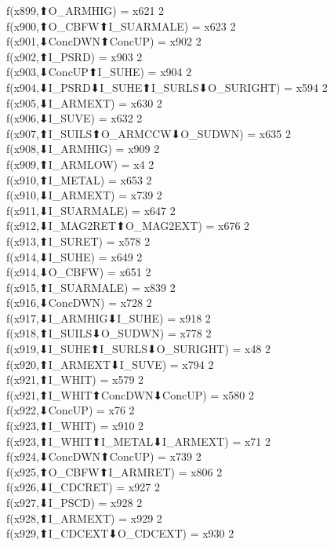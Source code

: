 f(x899,⬆O_ARMHIG) = x621 {2} \\
f(x900,⬆O_CBFW⬆I_SUARMALE) = x623 {2} \\
f(x901,⬇ConcDWN⬆ConcUP) = x902 {2} \\
f(x902,⬆I_PSRD) = x903 {2} \\
f(x903,⬇ConcUP⬆I_SUHE) = x904 {2} \\
f(x904,⬇I_PSRD⬇I_SUHE⬆I_SURLS⬇O_SURIGHT) = x594 {2} \\
f(x905,⬇I_ARMEXT) = x630 {2} \\
f(x906,⬇I_SUVE) = x632 {2} \\
f(x907,⬆I_SUILS⬆O_ARMCCW⬇O_SUDWN) = x635 {2} \\
f(x908,⬇I_ARMHIG) = x909 {2} \\
f(x909,⬆I_ARMLOW) = x4 {2} \\
f(x910,⬆I_METAL) = x653 {2} \\
f(x910,⬇I_ARMEXT) = x739 {2} \\
f(x911,⬇I_SUARMALE) = x647 {2} \\
f(x912,⬇I_MAG2RET⬆O_MAG2EXT) = x676 {2} \\
f(x913,⬆I_SURET) = x578 {2} \\
f(x914,⬇I_SUHE) = x649 {2} \\
f(x914,⬇O_CBFW) = x651 {2} \\
f(x915,⬆I_SUARMALE) = x839 {2} \\
f(x916,⬇ConcDWN) = x728 {2} \\
f(x917,⬇I_ARMHIG⬇I_SUHE) = x918 {2} \\
f(x918,⬆I_SUILS⬇O_SUDWN) = x778 {2} \\
f(x919,⬇I_SUHE⬆I_SURLS⬇O_SURIGHT) = x48 {2} \\
f(x920,⬆I_ARMEXT⬇I_SUVE) = x794 {2} \\
f(x921,⬆I_WHIT) = x579 {2} \\
f(x921,⬆I_WHIT⬆ConcDWN⬇ConcUP) = x580 {2} \\
f(x922,⬇ConcUP) = x76 {2} \\
f(x923,⬆I_WHIT) = x910 {2} \\
f(x923,⬆I_WHIT⬆I_METAL⬇I_ARMEXT) = x71 {2} \\
f(x924,⬇ConcDWN⬆ConcUP) = x739 {2} \\
f(x925,⬆O_CBFW⬆I_ARMRET) = x806 {2} \\
f(x926,⬇I_CDCRET) = x927 {2} \\
f(x927,⬇I_PSCD) = x928 {2} \\
f(x928,⬆I_ARMEXT) = x929 {2} \\
f(x929,⬆I_CDCEXT⬇O_CDCEXT) = x930 {2} \\
